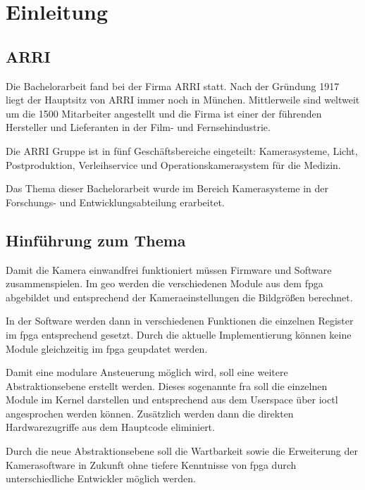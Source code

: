 \chapter{Einleitung}

\section{\acl{ARRI}}
Die Bachelorarbeit fand bei der Firma \acf{ARRI} statt. Nach der Gründung 1917 liegt der Hauptsitz von \ac{ARRI} immer noch in München. 
Mittlerweile sind weltweit um die 1500 Mitarbeiter angestellt und die Firma ist einer der führenden Hersteller und Lieferanten in der Film- und Fernsehindustrie.

Die \ac{ARRI} Gruppe ist in fünf Geschäftsbereiche eingeteilt: Kamerasysteme, Licht, Postproduktion, Verleihservice und Operationskamerasystem für die Medizin. \cite{arricorpinfo}

Das Thema dieser Bachelorarbeit wurde im Bereich Kamerasysteme in der Forschungs- und Entwicklungsabteilung erarbeitet.


\section{Hinführung zum Thema}\label{sec:thema}
Damit die Kamera einwandfrei funktioniert müssen Firmware und Software zusammenspielen. Im \ac{geo} werden die verschiedenen Module aus dem \ac{fpga} abgebildet und entsprechend der Kameraeinstellungen die Bildgrößen berechnet. 

In der Software werden dann in verschiedenen Funktionen die einzelnen Register im \ac{fpga} entsprechend gesetzt. Durch die aktuelle Implementierung können keine Module gleichzeitig im \ac{fpga} geupdatet werden. 

Damit eine modulare Ansteuerung möglich wird, soll eine weitere Abstraktionsebene erstellt werden. Dieses sogenannte \ac{fra} soll die einzelnen Module im Kernel darstellen und entsprechend aus dem Userspace über \ac{ioctl} angesprochen werden können. Zusätzlich werden dann die direkten Hardwarezugriffe aus dem Hauptcode eliminiert. 

Durch die neue Abstraktionsebene soll die Wartbarkeit sowie die Erweiterung der Kamerasoftware in Zukunft ohne tiefere Kenntnisse von \ac{fpga} durch unterschiedliche Entwickler möglich werden. 


